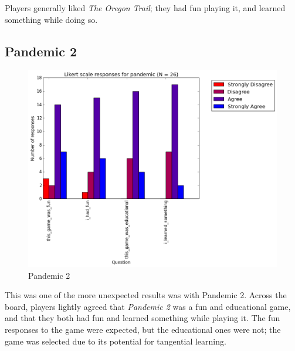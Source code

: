 				Players generally liked \textit{The Oregon Trail}; they had fun playing it, and learned something while doing so.

			\subsection{Pandemic 2}

				\begin{figure}[] 
				\centering 
				\includegraphics[width=\textwidth, height=.4\textheight, keepaspectratio=true]{pandemic_likert.png} 
				\caption{Pandemic 2}
				\end{figure}

				This was one of the more unexpected results was with Pandemic 2. Across the board, players lightly agreed that \textit{Pandemic 2} was a fun and educational game, and that they both had fun and learned something while playing it. The fun responses to the game were expected, but the educational ones were not; the game was selected due to its potential for tangential learning.

			\clearpage

